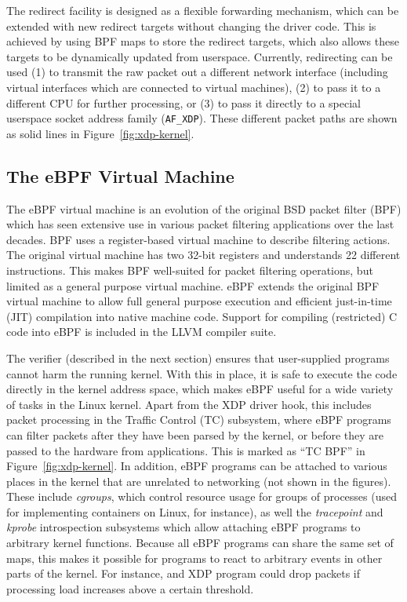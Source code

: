 \documentclass[10pt,sigconf,anonymous]{acmart}
\begin{document}
The redirect facility is designed as a flexible forwarding mechanism, which can
be extended with new redirect targets without changing the driver code. This is
achieved by using BPF maps to store the redirect targets, which also allows
these targets to be dynamically updated from userspace. Currently, redirecting
can be used (1) to transmit the raw packet out a different network interface
(including virtual interfaces which are connected to virtual machines), (2) to
pass it to a different CPU for further processing, or (3) to pass it directly to
a special userspace socket address family (\texttt{AF\_XDP}). These different
packet paths are shown as solid lines in Figure~\ref{fig:xdp-kernel}.

\subsection{The eBPF Virtual Machine}
\label{sec:bpf-vm}
The eBPF virtual machine is an evolution of the original BSD packet filter (BPF)
\cite{mccanne_bsd_1993} which has seen extensive use in various packet filtering
applications over the last decades. BPF uses a register-based virtual machine to
describe filtering actions. The original virtual machine has two 32-bit registers and
understands 22 different instructions. This makes BPF well-suited for packet
filtering operations, but limited as a general purpose virtual machine. eBPF
extends the original BPF virtual machine to allow full general purpose execution
and efficient just-in-time (JIT) compilation into native machine code. Support
for compiling (restricted) C code into eBPF is included in the LLVM compiler
suite.

The verifier (described in the next section) ensures that user-supplied programs
cannot harm the running kernel. With this in place, it is safe to execute the
code directly in the kernel address space, which makes eBPF useful for a wide
variety of tasks in the Linux kernel. Apart from the XDP driver hook, this
includes packet processing in the Traffic Control (TC) subsystem, where eBPF
programs can filter packets after they have been parsed by the kernel, or before
they are passed to the hardware from applications. This is marked as ``TC BPF''
in Figure~\ref{fig:xdp-kernel}. In addition, eBPF programs can be attached to
various places in the kernel that are unrelated to networking (not shown in the
figures). These include \emph{cgroups}, which control resource usage for groups
of processes (used for implementing containers on Linux, for instance), as well
the \emph{tracepoint} and \emph{kprobe} introspection subsystems which allow
attaching eBPF programs to arbitrary kernel functions. Because all eBPF programs
can share the same set of maps, this makes it possible for programs to react to
arbitrary events in other parts of the kernel. For instance, and XDP program
could drop packets if processing load increases above a certain threshold.
\end{document}
